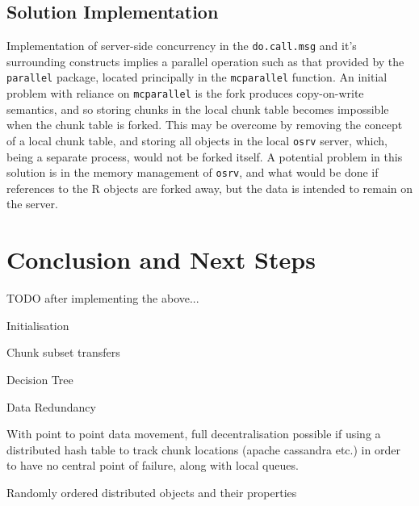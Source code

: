 \documentclass[a4paper,10pt]{article}
\begin{document}
\subsection{Solution Implementation}

Implementation of server-side concurrency in the
\texttt{do.call.msg} and it's surrounding constructs implies a
parallel operation such as that provided by the \texttt{parallel} package,
located principally in the \texttt{mcparallel} function.
An initial problem with reliance on \texttt{mcparallel} is the
fork produces copy-on-write semantics, and so storing chunks in the local chunk
table becomes impossible when the chunk table is forked.
This may be overcome by removing the concept of a local chunk table, and
storing all objects in the local \texttt{osrv} server, which, being a separate
process, would not be forked itself. 
A potential problem in this solution is in the memory management of
\texttt{osrv}, and what would be done if references to the R objects are forked
away, but the data is intended to remain on the server.

\section{Conclusion and Next Steps}

TODO after implementing the above...

Initialisation

Chunk subset transfers

Decision Tree

Data Redundancy

With point to point data movement, full decentralisation possible if using a
distributed hash table to track chunk locations (apache cassandra etc.) in
order to have no central point of failure, along with local queues.

Randomly ordered distributed objects and their properties

\printbibliography
\end{document}
